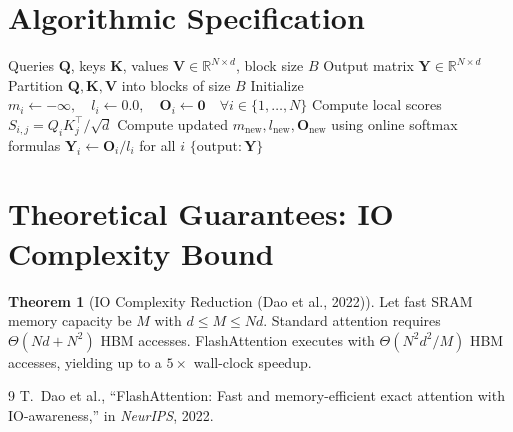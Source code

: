 \documentclass[11pt,a4paper]{article}
\theoremstyle{definition}
\newtheorem{theorem}{Theorem}[section]
\begin{document}
\section{Algorithmic Specification}

\begin{algorithm}[H]
\caption{FlashAttention Blocked Online Softmax Forward Pass}
\label{alg:flash_attn}
\begin{algorithmic}[1]
\Require Queries $\mathbf{Q}$, keys $\mathbf{K}$, values $\mathbf{V} \in \mathbb{R}^{N \times d}$, block size $B$
\Ensure Output matrix $\mathbf{Y} \in \mathbb{R}^{N \times d}$
\State Partition $\mathbf{Q}, \mathbf{K}, \mathbf{V}$ into blocks of size $B$
\State Initialize $m_i \gets -\infty, \quad l_i \gets 0.0, \quad \mathbf{O}_i \gets \mathbf{0} \quad \forall i \in \{1, \dots, N\}$
        \State Compute local scores $S_{i, j} = Q_i K_j^\top / \sqrt{d}$
        \State Compute updated $m_{\text{new}}, l_{\text{new}}, \mathbf{O}_{\text{new}}$ using online softmax formulas
    \EndFor
\EndFor
\State $\mathbf{Y}_i \gets \mathbf{O}_i / l_i$ for all $i$
\State \Return $\{\text{output}: \mathbf{Y}\}$
\end{algorithmic}
\end{algorithm}

\section{Theoretical Guarantees: IO Complexity Bound}

\begin{theorem}[IO Complexity Reduction (Dao et al., 2022)]
Let fast SRAM memory capacity be $M$ with $d \le M \le Nd$. Standard attention requires $\Theta(N d + N^2)$ HBM accesses. FlashAttention executes with $\Theta(N^2 d^2 / M)$ HBM accesses, yielding up to a $5\times$ wall-clock speedup.
\end{theorem}

\begin{thebibliography}{9}
 T.~Dao et al., ``FlashAttention: Fast and memory-efficient exact attention with IO-awareness,'' in \emph{NeurIPS}, 2022.
\end{thebibliography}
\end{document}
